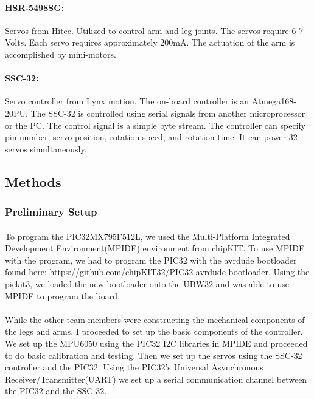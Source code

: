 \documentclass[letterpaper]{article}
\begin{document}
\paragraph{HSR-5498SG:}Servos from Hitec. Utilized to control arm and leg
joints.  The servos require 6-7 Volts. Each servo requires approximately 200mA.
The actuation of the arm is accomplished by mini-motors\cite{sscdata}.

\paragraph{SSC-32:}Servo controller from Lynx motion. The on-board controller
is an Atmega168-20PU. The SSC-32 is controlled using serial signals from another
microprocessor or the PC. The control signal is a simple byte stream. The
controller can specify pin number, servo position, rotation speed, and rotation
time. It can power 32 servos simultaneously\cite{servodata}.

\subsection{Methods}
\subsubsection{Preliminary Setup}
\paragraph{}To program the PIC32MX795F512L, we used the Multi-Platform
Integrated Development Environment(MPIDE) environment from chipKIT. To use MPIDE
with the program, we had to program the PIC32 with the avrdude bootloader found
here: \url{https://github.com/chipKIT32/PIC32-avrdude-bootloader}. Using the
pickit3, we loaded the new bootloader onto the UBW32 and was able to use MPIDE
to program the board.

\paragraph{}While the other team members were constructing the mechanical
components of the legs and arms, I proceeded to set up the basic components of
the controller. We set up the MPU6050 using the PIC32 I2C libraries in MPIDE and
proceeded to do basic calibration and testing. Then we set up the servos using
the SSC-32 controller and the PIC32. Using the PIC32's Universal Asynchronous
Receiver/Transmitter(UART) we set up a serial communication channel between the
PIC32 and the SSC-32.  
\end{document}

